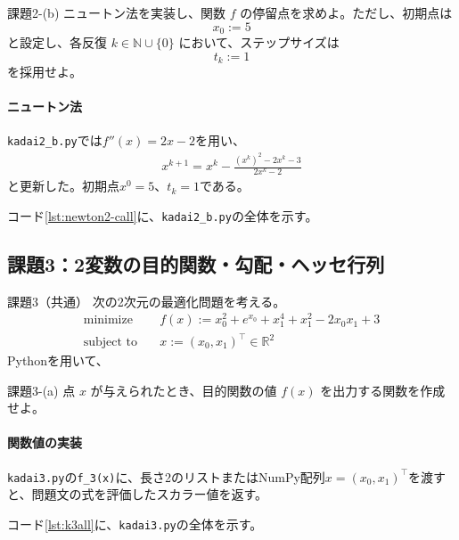 \documentclass[a4j]{jarticle}
\begin{document}
\begin{itembox}[l]{課題2-(b)}
ニュートン法を実装し、関数 $f$ の停留点を求めよ。ただし、初期点は
\[
x_0:=5
\]
と設定し、各反復 $k\in\mathbb{N}\cup\{0\}$ において、ステップサイズは
\[
t_k:=1
\]
を採用せよ。
\end{itembox}
\paragraph{ニュートン法}

\texttt{kadai2\_b.py}では$f''(x)=2x-2$を用い、
\begin{align}
  x^{k+1}=x^k-\frac{(x^k)^2-2x^k-3}{2x^k-2}
\end{align}
と更新した。初期点$x^0=5$、$t_k=1$である。

\par\noindent
コード\ref{lst:newton2-call}に、\texttt{kadai2\_b.py}の全体を示す。
\par




\subsection{課題3：2変数の目的関数・勾配・ヘッセ行列}
\label{sec:task3}
\begin{itembox}[l]{課題3（共通）}
次の2次元の最適化問題を考える。
\[
\begin{aligned}
\operatorname{minimize}\quad &f(x):=x_0^2+e^{x_0}+x_1^4+x_1^2-2x_0x_1+3\\
\operatorname{subject\ to}\quad &x:=(x_0,x_1)^\top\in\mathbb{R}^2
\end{aligned}
\]
Pythonを用いて、
\end{itembox}
\begin{itembox}[l]{課題3-(a)}
点 $x$ が与えられたとき、目的関数の値 $f(x)$ を出力する関数を作成せよ。
\end{itembox}
\paragraph{関数値の実装}

\texttt{kadai3.py}の\texttt{f\_3(x)}に、長さ2のリストまたはNumPy配列$x=(x_0,x_1)^\top$を渡すと、問題文の式を評価したスカラー値を返す。
\par\noindent
コード\ref{lst:k3all}に、\texttt{kadai3.py}の全体を示す。
\par

\end{document}
